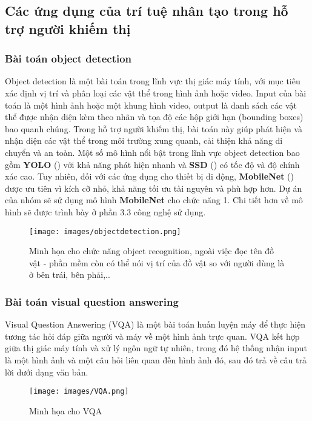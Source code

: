 \documentclass[a4paper,12pt]{article}
\begin{document}
\subsection{Các ứng dụng của trí tuệ nhân tạo trong hỗ trợ người khiếm thị}

\subsubsection{Bài toán object detection}
Object detection là một bài toán trong lĩnh vực thị giác máy tính, với mục tiêu xác định vị trí và phân loại các vật thể trong hình ảnh hoặc video. Input của bài toán là một hình ảnh hoặc một khung hình video, output là danh sách các vật thể được nhận diện kèm theo nhãn và tọa độ các hộp giới hạn (bounding boxes) bao quanh chúng. Trong hỗ trợ người khiếm thị, bài toán này giúp phát hiện và nhận diện các vật thể trong môi trường xung quanh, cải thiện khả năng di chuyển và an toàn. Một số mô hình nổi bật trong lĩnh vực object detection bao gồm \textbf{YOLO} (\cite{redmon2016you}) với khả năng phát hiện nhanh và \textbf{SSD} (\cite{liu2016ssd}) có tốc độ và độ chính xác cao. Tuy nhiên, đối với các ứng dụng cho thiết bị di động, \textbf{MobileNet} (\cite{howard2017mobilenets}) được ưu tiên vì kích cỡ nhỏ, khả năng tối ưu tài nguyên và phù hợp hơn. Dự án của nhóm sẽ sử dụng mô hình \textbf{MobileNet} cho chức năng 1. Chi tiết hơn về mô hình sẽ được trình bày ở phần 3.3 công nghệ sử dụng.
\begin{figure}[H]
    \centering
    \texttt{[image: images/objectdetection.png]}
    \caption{Minh họa cho chức năng object recognition, ngoài việc đọc tên đồ vật - phần mềm còn có thể nói vị trí của đồ vật so với người dùng là ở bên trái, bên phải,..}
\end{figure}
\subsubsection{Bài toán visual question answering}
Visual Question Answering (VQA) là một bài toán huấn luyện máy để thực hiện tương tác hỏi đáp giữa người và máy về một hình ảnh trực quan. VQA kết hợp giữa thị giác máy tính và xử lý ngôn ngữ tự nhiên, trong đó hệ thống nhận input là một hình ảnh và một câu hỏi liên quan đến hình ảnh đó, sau đó trả về câu trả lời dưới dạng văn bản.

\begin{figure}
    \centering
    \texttt{[image: images/VQA.png]}
    \caption{Minh họa cho VQA}
    \label{fig:enter-label}
\end{figure}
\end{document}
